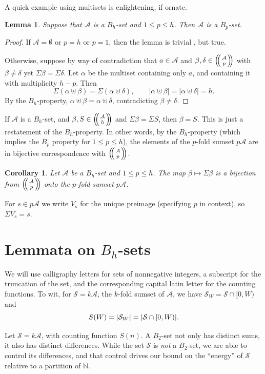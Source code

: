 \documentclass[10pt,letterpaper]{article}
\newcommand{\NN}{\ensuremath{\mathbb N}}
\newcommand{\cA}{\mathcal{A}}
\newcommand{\cS}{\mathcal{S}}
\DeclarePairedDelimiter{\abs}{\lvert}{\rvert}
\newcommand{\multibinom}[2]{\left(\kern-0.3em\left(\genfrac{}{}{0pt}{}{#1}{#2}\right)\kern-0.3em\right)}
\newtheorem{lem}[thm]{Lemma}
\newtheorem{cor}[thm]{Corollary}
\theoremstyle{remark}
\begin{document}
A quick example using multisets is enlightening, if ornate.
\begin{lem}\label{lem:B_h is B_p}
  Suppose that $\cA$ is a $B_h$-set and $1\le p \le h$. Then $\cA$ is a $B_p$-set. 
\end{lem}
\begin{proof}
If $\cA=\emptyset$ or $p=h$ or $p=1$, then the lemma is trivial , but true. 

Otherwise, suppose by way of contradiction that $a\in\cA$ and $\beta,\delta \in \multibinom{\cA}{p}$ with $\beta\neq \delta$ yet $\Sigma \beta = \Sigma \delta$. Let $\alpha$ be the multiset containing only $a$, and containing it with multiplicity $h-p$. Then
  \[\Sigma (\alpha \uplus \beta) = \Sigma(\alpha \uplus \delta),
  \qquad |\alpha \uplus \beta| = |\alpha \uplus \delta| =h.\]
By the $B_h$-property, $\alpha \uplus \beta = \alpha \uplus \delta$, contradicting $\beta \neq \delta$.
\end{proof}

If $\cA$ is a $B_h$-set, and $\beta,S \in \multibinom{\cA}{h}$ and $\Sigma \beta = \Sigma S$, then $\beta=S$. 
This is just a restatement of the $B_h$-property.
In other words, by the $B_h$-property (which implies the $B_p$ property for $1\le p\le h$), the elements of the $p$-fold sumset $p\cA$ are in bijective correspondence with $\multibinom{\cA}{p}$.

\begin{cor}\label{cor:Vs}
Let $\cA$ be a $B_h$-set and $1\le p\le h$. The map $\beta\mapsto\Sigma\beta$
is a bijection from $\multibinom{\cA}{p}$ onto the $p$-fold sumset $p\cA$.
\end{cor}

For $s\in p\cA$ we write $V_s$ for the unique preimage (specifying $p$ in context), so $\Sigma V_s=s$.

\section{Lemmata on $B_h$-sets}
We will use calligraphy letters for sets of nonnegative integers, a subscript for the truncation of the set, and the corresponding capital latin letter for the counting functions. To wit, for $\cS=k\cA$, the $k$-fold sumset of $\cA$, we have $\cS_W = \cS\cap[0,W)$ and
  \[S(W) = \abs*{\cS_W} = \abs*{\cS \cap [0,W)}.\]

Let $\cS = k\cA$, with counting function $S(n)$. A $B_2$-set not only has distinct sums, it also has distinct differences. While the set $\cS$ is \emph{not} a $B_2$-set, we are able to control its differences, and that control drives our bound on the ``energy'' of $\cS$ relative to a partition of $\NN$.
\end{document}

